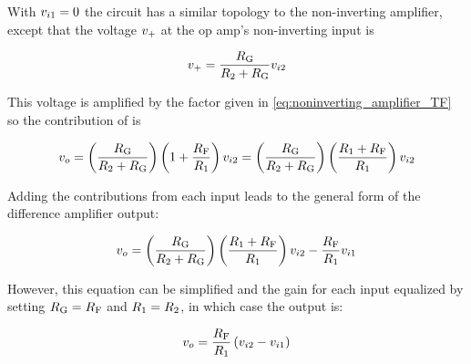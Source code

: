 With \(\vin[1] = 0\) the circuit has a similar topology to the non-inverting amplifier, except that the voltage \(v_\mathrm{+}\) at the op amp's non-inverting input is

\begin{equation*}
	v\sub{+}= \frac{\R[G]}{\R[2] + \R[G]}\vin[2]
\end{equation*}

This voltage is amplified by the factor given in \eqref{eq:noninverting_amplifier_TF} so the contribution of \vin[2] is

\begin{equation*}
	\vout = \left(\frac{\R[G]}{\R[2] + \R[G]}\right)\left(1 + \frac{\R[F]}{\R[1]}\right)\vin[2] = \left(\frac{\R[G]}{\R[2] + \R[G]}\right)\left(\frac{\R[1] + \R[F]}{\R[1]}\right)\vin[2]
\end{equation*}

Adding the contributions from each input leads to the general form of the difference amplifier output:

\begin{equation}
	\vout = \left(\frac{\R[G]}{\R[2] + \R[G]}\right)\left(\frac{\R[1] + \R[F]}{\R[1]}\right)\vin[2] - \frac{\R[F]}{\R[1]}\vin[1]
	\label{eq:difference_amp_general}
\end{equation}

However, this equation can be simplified and the gain for each input equalized by setting \(\R[G] = \R[F]\) and \(\R[1] = \R[2]\), in which case the output is:

\begin{equation}
	\vout = \frac{\R[F]}{\R[1]}\left(\vin[2] - \vin[1]\right)
	\label{eq:difference_amp}
\end{equation}



